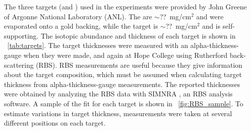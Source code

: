 The three targets (\GeTargets and ) used in the experiments were provided by John Greene of Argonne National Laboratory (ANL).  The \GeTargets are $\sim$??~mg/cm$^2$ and were evaporated onto a gold backing, while the  target is $\sim$??~mg/cm$^2$ and is self-supporting.  The isotopic abundance and thickness of each target is shown in {\tab}~\ref{tab:targets}.  The target thicknesses were measured with an alpha-thickness-gauge when they were made, and again at Hope College using Rutherford back-scattering (RBS).  RBS measurements are useful because they give information about the target composition, which must be assumed when calculating target thickness from alpha-thickness-gauge measurements.  The reported thicknesses were obtained by analyzing the RBS data with SIMNRA \cite{SIMNRA}, an RBS analysis software.  A sample of the fit for each target is shown in {\fig}~\ref{fig:RBS_sample}.  To estimate variations in target thickness, measurements were taken at several different positions on each target.
\begin{figure}[!htbp]
\centering
{}
\caption{}
\label{fig:fig:RBS_sample}
\end{figure}
